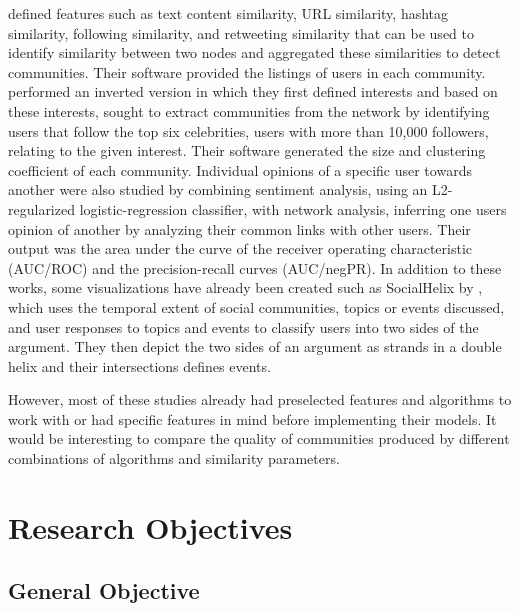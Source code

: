  defined features such as text content similarity, URL similarity, hashtag similarity, following similarity, and retweeting similarity that can be used to identify similarity between two nodes and aggregated these similarities to detect communities. Their software provided the listings of users in each community.  performed an inverted version in which they first defined interests and based on these interests, sought to extract communities from the network by identifying users that follow the top six celebrities, users with more than 10,000 followers, relating to the given interest. Their software generated the size and clustering coefficient of each community. Individual opinions of a specific user towards another were also studied by  combining sentiment analysis, using an L2-regularized logistic-regression classifier, with network analysis, inferring one user\vtick s opinion of another by analyzing their common links with other users. Their output was the area under the curve of the receiver operating characteristic (AUC/ROC) and the precision-recall curves (AUC/negPR). In addition to these works, some visualizations have already been created such as SocialHelix by , which uses the temporal extent of social communities, topics or events discussed, and user responses to topics and events to classify users into two sides of the argument. They then depict the two sides of an argument as strands in a double helix and their intersections defines events.




However, most of these studies already had preselected features and algorithms to work with or had specific features in mind before implementing their models. It would be interesting to compare the quality of communities produced by different combinations of algorithms and similarity parameters.




\section{Research Objectives}
\label{sec:researchobjectives}




\subsection{General Objective}
\label{sec:generalobjective}




